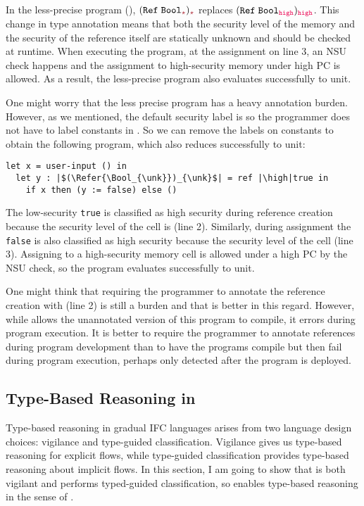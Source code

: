 In the less-precise program (), $(\Refer{\Bool_{\unk}})_{\unk}$
replaces $(\Refer{\Bool_{\high}})_{\high}$. This change in type annotation means
that both the security level of the memory and the security of the reference
itself are statically unknown and should be checked at runtime. When executing
the program, at the assignment on line 3, an NSU check happens and the
assignment to high-security memory under high PC is allowed. As a result, the
less-precise program also evaluates successfully to unit.

One might worry that the less precise program has a heavy annotation burden.
However, as we mentioned, the default security label is \low so the programmer
does not have to label constants in \Surface. So we can remove the labels on
constants to obtain the following program, which also reduces successfully to
unit:
\begin{lstlisting}[style=tt]
  let x = user-input () in
  let y : |$(\Refer{\Bool_{\unk}})_{\unk}$| = ref |\high|true in
    if x then (y := false) else ()
\end{lstlisting}
\noindent The low-security \texttt{true} is classified as high security during
reference creation because the security level of the cell is \high (line 2).
Similarly, during assignment the \texttt{false} is also classified as high
security because the security level of the cell (line 3). Assigning to a
high-security memory cell is allowed under a high PC by the NSU check, so the
program evaluates successfully to unit.

One might think that requiring the programmer to annotate the reference creation
with \high (line 2) is still a burden and that \GSLRef is better in this regard.
However, while \GSLRef allows the unannotated version of this program to
compile, it errors during program execution. It is better to require the
programmer to annotate references during program development than to have the
programs compile but then fail during program execution, perhaps only detected
after the program is deployed.

\subsection{Type-Based Reasoning in \Surface}
\label{sec:example3}

Type-based reasoning in gradual IFC languages arises from two language design
choices: vigilance and type-guided classification. Vigilance gives us type-based
reasoning for explicit flows, while type-guided classification provides
type-based reasoning about implicit flows. In this section, I am going to show
that \Surface is both vigilant and performs typed-guided classification, so
\Surface enables type-based reasoning in the sense of \textcite{Toro:2018aa}.

